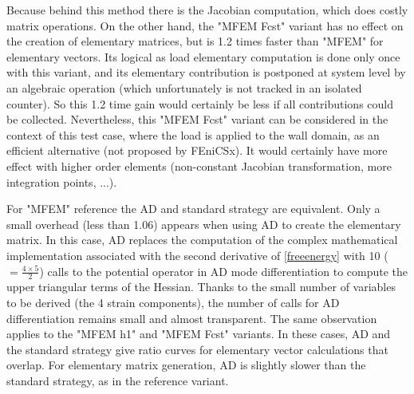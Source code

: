 \documentclass[12pt]{article}
\newcommand{\f}[1]{FEniCSx#1}
\begin{document}
Because behind this method there is the Jacobian computation, which does costly matrix operations.
On the other hand, the "{\color{MFEMForestGreen}MFEM Fcst}" variant has no effect on the creation of elementary matrices, but is 1.2 times faster than "{\color{MFEMGreen}MFEM}" for elementary vectors.
Its logical as load elementary computation is done only once with this variant, and its elementary contribution is postponed at system level by an algebraic operation (which unfortunately is not tracked in an isolated counter).
So this 1.2 time gain would certainly be less if all contributions could be collected.
Nevertheless, this "{\color{MFEMForestGreen}MFEM Fcst}" variant can be considered in the context of this test case, where the load is applied to the wall domain, as an efficient alternative (not proposed by \f{}). It would certainly have more effect with higher order elements (non-constant Jacobian transformation, more integration points, ...). 


For "{\color{MFEMGreen}MFEM}" reference the AD and standard  strategy are equivalent.
Only a small overhead (less than 1.06) appears when using AD to create the elementary matrix.
In this case, AD replaces the computation of the complex mathematical implementation associated with the second derivative of \ref{freeenergy} with 10 ($=\frac{4\times5}{2}$) calls to the potential operator in AD mode differentiation to compute the upper triangular terms of the Hessian.
Thanks to the small number of variables to be derived (the 4 strain components), the number of calls for AD differentiation remains small and almost transparent.
The same observation applies to the "{\color{MFEMDarkGreen}MFEM h1}" and "{\color{MFEMForestGreen}MFEM Fcst}" variants.
In these cases, AD and the standard strategy give ratio curves for elementary vector calculations that overlap.
For elementary matrix generation, AD is slightly slower than the standard strategy, as in the reference variant.



\bigskip 
\end{document}
